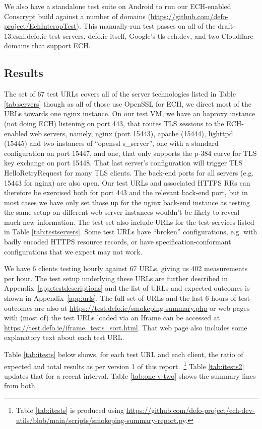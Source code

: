 We also have a standalone test suite on Android to run our ECH-enabled
Conscrypt build against a number of domains
(\url{https://github.com/defo-project/EchInteropTest}).  This manually-run test
passes on all of the draft-13.esni.defo.ie test servers, defo.ie itself,
Google's tls-ech.dev, and two Cloudflare domains that support ECH.

\subsection{Results}

The set of 67 test URLs covers all of the server technologies listed in Table
\ref{tab:servers} though as all of those use OpenSSL for ECH, we direct most
of the URLs towards one nginx instance. On our test VM, we have an haproxy
instance (not doing ECH) listening on port 443, that routes TLS sessions to
the ECH-enabled web servers, namely, nginx (port 15443), apache (15444),
lighttpd (15445) and two instances of ``openssl s\_server'', one with a
standard configuration on port 15447, and one, that only supports the p-384
curve for TLS key exchange on port 15448. That last server's configuration will
trigger TLS HelloRetryRequest for many TLS clients. The back-end ports for all
servers (e.g. 15443 for nginx) are also open. Our test URLs and associated
HTTPS RRs can therefore be exercised both for port 443 and the relevant
back-end port, but in most cases we have only set those up for the nginx
back-end instance as testing the same setup on different web server instances
wouldn't be likely to reveal much new information.  The test set also include
URLs for the test services listed in Table \ref{tab:testservers}.  Some test
URLs have ``broken'' configurations, e.g. with badly encoded HTTPS resource
records, or have specification-conformant configurations that we expect may not
work.

We have 6 clients testing hourly against 67 URLs, giving us 402 measurements
per hour. The test setup underlying these URLs are further described in
Appendix~\ref{app:testdescriptions} and the list of URLs and expected outcomes
is shown in Appendix~\ref{app:urls}.  The full set of URLs and the last 6 hours
of test outcomes are also at \url{https://test.defo.ie/smokeping-summary.php}
or web pages with (most of) the test URLs loaded via an Iframe can be accessed
at \url{https://test.defo.ie/iframe_tests_sort.html}. That web page also
includes some explanatory text about each test URL.

Table \ref{tab:itests} below shows, for each test URL and each client,
the ratio of expected and total results as per version 1 of this
report.~\footnote{Table \ref{tab:itests} is produced
using \url{https://github.com/defo-project/ech-dev-utils/blob/main/scripts/smokeping-summary-report.py}.}
Table \ref{tab:itests2} updates that for a recent interval.
Table \ref{tab:one-v-two} shows the summary lines from both.

